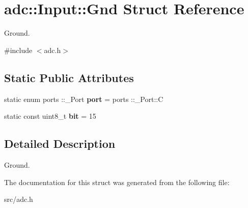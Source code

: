 \hypertarget{structadc_1_1Input_1_1Gnd}{}\section{adc\+:\+:Input\+:\+:Gnd Struct Reference}
\label{structadc_1_1Input_1_1Gnd}


Ground.  




{\ttfamily \#include $<$adc.\+h$>$}

\subsection*{Static Public Attributes}
\begin{DoxyCompactItemize}
\item 
\hypertarget{structadc_1_1Input_1_1Gnd_a1115375eb1ceecc4104601bff24bd253}{}\label{structadc_1_1Input_1_1Gnd_a1115375eb1ceecc4104601bff24bd253} 
static enum ports \+::\+\_\+\+Port {\bfseries port} = ports \+::\+\_\+\+Port\+::C
\item 
\hypertarget{structadc_1_1Input_1_1Gnd_ac4396959d7953db075098bb106a39deb}{}\label{structadc_1_1Input_1_1Gnd_ac4396959d7953db075098bb106a39deb} 
static const uint8\+\_\+t {\bfseries bit} = 15
\end{DoxyCompactItemize}


\subsection{Detailed Description}
Ground. 

The documentation for this struct was generated from the following file\+:\begin{DoxyCompactItemize}
\item 
src/adc.\+h\end{DoxyCompactItemize}
